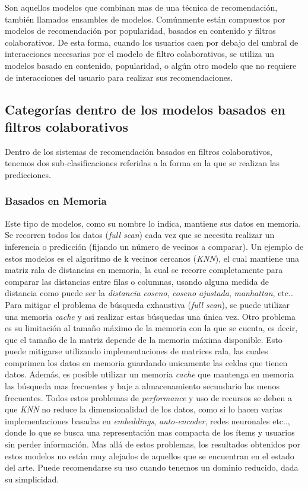 \documentclass[11pt,a4paper,twoside]{thesis}
\begin{document}
Son aquellos modelos que combinan mas de una técnica de recomendación, también
llamados ensambles de modelos. Comúnmente están compuestos por modelos de
recomendación por popularidad, basados en contenido y filtros colaborativos. De
esta forma, cuando los usuarios caen por debajo del umbral de interacciones
necesarias por el modelo de filtro colaborativos, se utiliza un modelos basado
en contenido, popularidad, o algún otro modelo que no requiere de interacciones
del usuario para realizar sus recomendaciones.

\subsection{Categorías dentro de los modelos basados en filtros colaborativos}

Dentro de los sistemas de recomendación basados en filtros colaborativos,
tenemos dos sub-clasificaciones referidas a la forma en la que se realizan las
predicciones.

\subsubsection{Basados en Memoria}

Este tipo de modelos, como su nombre lo indica, mantiene sus datos en memoria.
Se recorren todos los datos (\textit{full scan}) cada vez que se necesita
realizar un inferencia o predicción (fijando un número de vecinos a comparar).
Un ejemplo de estos modelos es el algoritmo de k vecinos cercanos
(\textit{KNN}), el cual mantiene una matriz rala de distancias en memoria, la
cual se recorre completamente para comparar las distancias entre filas o
columnas, usando alguna medida de distancia como puede ser la \textit{distancia
	coseno}, \textit{coseno ajustada}, \textit{manhattan}, etc.. Para mitigar el
problema de búsqueda exhaustiva (\textit{full scan}), se puede utilizar una
memoria \textit{cache} y asi realizar estas búsquedas una única vez. Otro
problema es su limitación al tamaño máximo de la memoria con la que se cuenta,
es decir, que el tamaño de la matriz depende de la memoria máxima disponible.
Esto puede mitigarse utilizando implementaciones de matrices rala, las cuales
comprimen los datos en memoria guardando unicamente las celdas que tienen
datos. Además, es posible utilizar un memoria \textit{cache} que mantenga en
memoria las búsqueda mas frecuentes y baje a almacenamiento secundario las
menos frecuentes. Todos estos problemas de \textit{performance} y uso de
recursos se deben a que \textit{KNN} no reduce la dimensionalidad de los datos,
como si lo hacen varias implementaciones basadas en \textit{embeddings},
\textit{auto-encoder}, redes neuronales etc.., donde lo que se busca una
representación mas compacta de los ítems y usuarios sin perder información. Mas
allá de estos problemas, los resultados obtenidos por estos modelos no están
muy alejados de aquellos que se encuentran en el estado del arte. Puede
recomendarse su uso cuando tenemos un dominio reducido, dada su simplicidad.
\end{document}
